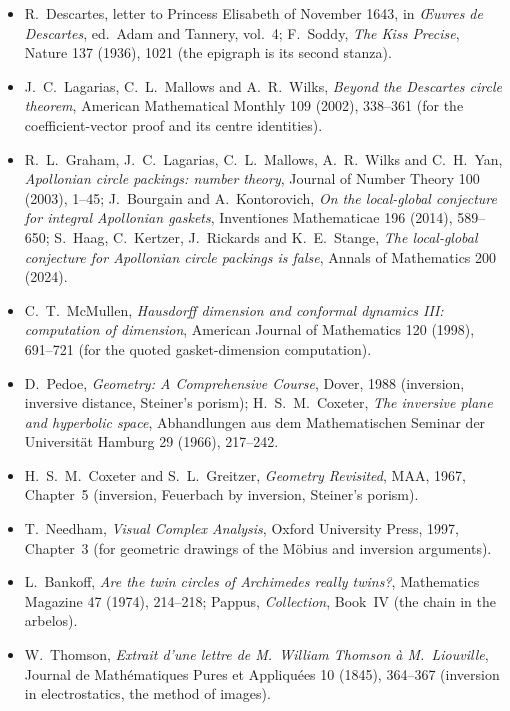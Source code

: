 \begin{itemize}
\item R.~Descartes, letter to Princess Elisabeth of November 1643, in \emph{\OE uvres de Descartes}, ed.\ Adam and Tannery, vol.~4; F.~Soddy,
\emph{The Kiss Precise}, Nature 137 (1936), 1021 (the epigraph is its second stanza).
\item J.~C.~Lagarias, C.~L.~Mallows and A.~R.~Wilks, \emph{Beyond the Descartes circle theorem}, American Mathematical Monthly 109 (2002), 338--361
(for the coefficient-vector proof and its centre identities).
\item R.~L.~Graham, J.~C.~Lagarias, C.~L.~Mallows, A.~R.~Wilks and C.~H.~Yan, \emph{Apollonian circle packings: number theory}, Journal of Number
Theory 100 (2003), 1--45; J.~Bourgain and A.~Kontorovich, \emph{On the local-global conjecture for integral Apollonian gaskets}, Inventiones
Mathematicae 196 (2014), 589--650; S.~Haag, C.~Kertzer, J.~Rickards and K.~E.~Stange, \emph{The local-global conjecture for Apollonian circle
packings is false}, Annals of Mathematics 200 (2024).
\item C.~T.~McMullen, \emph{Hausdorff dimension and conformal dynamics III: computation of dimension}, American Journal of Mathematics 120 (1998),
691--721 (for the quoted gasket-dimension computation).
\item D.~Pedoe, \emph{Geometry: A Comprehensive Course}, Dover, 1988 (inversion, inversive distance, Steiner's porism); H.~S.~M.~Coxeter, \emph{The
inversive plane and hyperbolic space}, Abhandlungen aus dem Mathematischen Seminar der Universit\"at Hamburg 29 (1966), 217--242.
\item H.~S.~M.~Coxeter and S.~L.~Greitzer, \emph{Geometry Revisited}, MAA, 1967, Chapter~5 (inversion, Feuerbach by inversion, Steiner's porism).
\item T.~Needham, \emph{Visual Complex Analysis}, Oxford University Press, 1997, Chapter~3 (for geometric drawings of the M\"obius and inversion arguments).
\item L.~Bankoff, \emph{Are the twin circles of Archimedes really twins?}, Mathematics Magazine 47 (1974), 214--218; Pappus, \emph{Collection},
Book~IV (the chain in the arbelos).
\item W.~Thomson, \emph{Extrait d'une lettre de M.~William Thomson \`a M.~Liouville}, Journal de Math\'ematiques Pures et Appliqu\'ees 10 (1845),
364--367 (inversion in electrostatics, the method of images).
\end{itemize}
